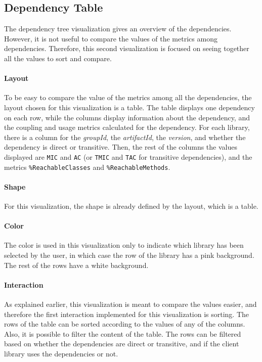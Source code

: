 \subsection{Dependency Table}
The dependency tree visualization gives an overview of the dependencies. However, it is not useful to compare the values of the metrics among dependencies. Therefore, this second visualization is focused on seeing together all the values to sort and compare.

\paragraph{Layout}
To be easy to compare the value of the metrics among all the dependencies, the layout chosen for this visualization is a table. The table displays one dependency on each row, while the columns display information about the dependency, and the coupling and usage metrics calculated for the dependency. For each library, there is a column for the \textit{groupId}, the \textit{artifactId}, the \textit{version}, and whether the dependency is direct or transitive. Then, the rest of the columns the values displayed are \texttt{MIC} and \texttt{AC} (or \texttt{TMIC} and \texttt{TAC} for transitive dependencies), and the metrics \texttt{\%ReachableClasses} and \texttt{\%ReachableMethods}.

\paragraph{Shape}
For this visualization, the shape is already defined by the layout, which is a table.

\paragraph{Color}
The color is used in this visualization only to indicate which library has been selected by the user, in which case the row of the library has a pink background. The rest of the rows have a white background.

\paragraph{Interaction}
As explained earlier, this visualization is meant to compare the values easier, and therefore the first interaction implemented for this visualization is sorting. The rows of the table can be sorted according to the values of any of the columns. Also, it is possible to filter the content of the table. The rows can be filtered based on whether the dependencies are direct or transitive, and if the client library uses the dependencies or not.

